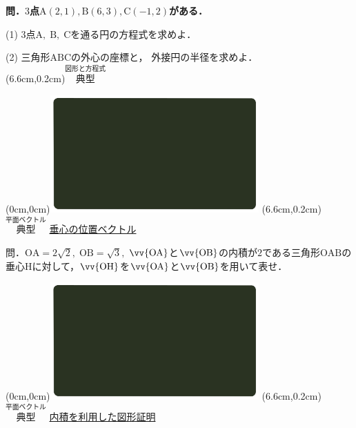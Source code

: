 \documentclass[10pt,
fleqn,
dvipdfmx,
uplatex
]{jsarticle}
\begin{document}
\normalsize 
\bf\boldmath 問．$3$点$\text{A}\left(2,1\right),\text{B}\left(6,3\right),\text{C}\left(-1,2\right)$がある．

\normalsize
\vspace{0.3zw}
(1)  $3$点$\text{A},\;\text{B},\;\text{C}$を通る円の方程式を求めよ．

\LARGE
(2)  三角形$\text{ABC}$の外心の座標と，
外接円の半径を求めよ．\\

\at(6.6cm,0.2cm){\small\color{bradorange}$\overset{\text{図形と方程式}}{\text{典型}}$}

\newpage



\at(0cm,0cm){\includegraphics[width=8cm,bb=0 0 1920 1080]{./youtube/thumbnails/templates/smart_background/平面ベクトル.jpeg}}
\at(6.6cm,0.2cm){\small\color{bradorange}$\overset{\text{平面ベクトル}}{\text{典型}}$}
{\color{orange}\LARGE\underline{垂心の位置ベクトル}}\vspace{0.3zw}

\Large 
問．$\text{OA}=2\sqrt 2,\;\text{OB}=\sqrt 3,\;$$\vv{\text{OA}}$と$\vv{\text{OB}}$の内積が$2$である三角形$\text{OAB}$の垂心$\text{H}$に対して，$\vv{\text{OH}}$を$\vv{\text{OA}}$と$\vv{\text{OB}}$を用いて表せ．


\newpage



\at(0cm,0cm){\includegraphics[width=8cm,bb=0 0 1920 1080]{./youtube/thumbnails/templates/smart_background/平面ベクトル.jpeg}}
\at(6.6cm,0.2cm){\small\color{bradorange}$\overset{\text{平面ベクトル}}{\text{典型}}$}
{\color{orange}\LARGE\underline{内積を利用した図形証明}}\vspace{0.3zw}
\end{document}

